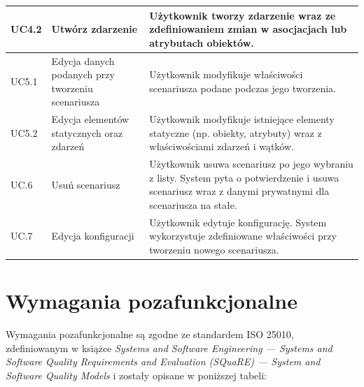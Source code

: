 {\begin{longtable}{|p{1cm}|p{4.5cm}|p{8cm}|}
    \hline
    UC4.2 & Utwórz zdarzenie & Użytkownik tworzy zdarzenie wraz ze zdefiniowaniem zmian w asocjacjach lub atrybutach obiektów. \\
    \hline
    UC5.1 & Edycja danych podanych przy tworzeniu scenariusza & Użytkownik modyfikuje właściwości scenariusza podane podczas jego tworzenia. \\
    \hline
    UC5.2 & Edycja elementów statycznych oraz zdarzeń & Użytkownik modyfikuje istniejące elementy statyczne (np. obiekty, atrybuty) wraz z właściwościami zdarzeń i wątków. \\
    \hline
    UC.6 & Usuń scenariusz & Użytkownik usuwa scenariusz po jego wybraniu z listy. System pyta o potwierdzenie i usuwa scenariusz wraz z danymi prywatnymi dla scenariusza na stałe. \\
    \hline
    UC.7 & Edycja konfiguracji & Użytkownik edytuje konfigurację. System wykorzystuje zdefiniowane właściwości przy tworzeniu nowego scenariusza. \\
    \hline
\end{longtable}
}
\normalsize
\section{Wymagania pozafunkcjonalne}
Wymagania pozafunkcjonalne są zgodne ze standardem ISO 25010, zdefiniowanym w książce 
\emph{Systems and Software Engineering — Systems and Software Quality Requirements and Evaluation (SQuaRE) — System and Software Quality Models} 
\cite{iso25010} i zostały opisane w poniższej tabeli:

